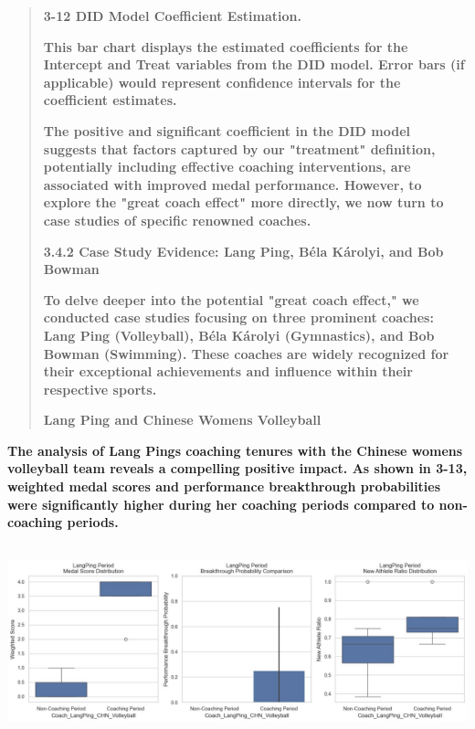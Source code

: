\documentclass[12pt,a4paper]{article}
\renewenvironment{quote}{\begin{quotation}}{\end{quotation}}  %
\begin{document}
    \begin{quote}
    \textbf{3-12 DID Model Coefficient Estimation.}
    
    \textbf{This bar chart displays the estimated coefficients for the
    Intercept and Treat variables from the DID model. Error bars (if
    applicable) would represent confidence intervals for the coefficient
    estimates.}
    
    \textbf{The positive and significant coefficient in the DID model
    suggests that factors captured by our "treatment" definition,
    potentially including effective coaching interventions, are associated
    with improved medal performance. However, to explore the "great coach
    effect" more directly, we now turn to case studies of specific renowned
    coaches.}
    
    \protect{}\label{bookmark20-1}{}\textbf{3.4.2 Case Study
    Evidence: Lang Ping, Béla Károlyi, and Bob Bowman}
    
    \textbf{To delve deeper into the potential "great coach effect," we
    conducted case studies focusing on three prominent coaches: Lang Ping
    (Volleyball), Béla Károlyi (Gymnastics), and Bob Bowman (Swimming).
    These coaches are widely recognized for their exceptional achievements
    and influence within their respective sports.}
    
    \textbf{Lang Ping and Chinese Women\textquotesingle s Volleyball}
    \end{quote}
    
    \textbf{The analysis of Lang Ping\textquotesingle s coaching tenures
    with the Chinese women\textquotesingle s volleyball team reveals a
    compelling positive impact. As shown in 3-13, weighted medal scores and
    performance breakthrough probabilities were significantly higher during
    her coaching periods compared to non-coaching periods.}
    
    \includegraphics[width=6.29833in,height=2.20167in]{./media/media/image22.png}
    
\end{document}
